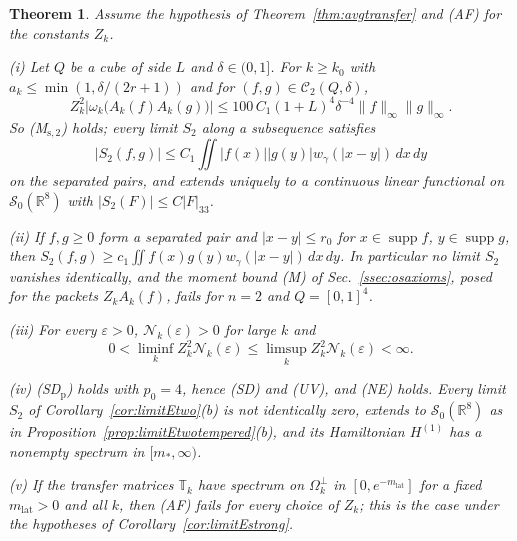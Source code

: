\documentclass[aps,prd,twocolumn,superscriptaddress,nofootinbib,longbibliography,floatfix,amsmath,amssymb,10pt]{revtex4-2}
\newtheorem{theorem}{Theorem}
\theoremstyle{definition}
\theoremstyle{remark}
\newcommand{\R}{\mathbb{R}}
\begin{document}
\begin{theorem}\label{thm:limitEaf}
Assume the hypothesis of Theorem~\textup{\ref{thm:avgtransfer}} and
\textup{(AF)} for the constants $Z_k$.

\textup{(i)} Let $Q$ be a cube of side $L$ and $\delta\in(0,1]$. For
$k\ge k_0$ with $a_k\le\min(1,\delta/(2r+1))$ and for $(f,g)\in\mathcal
C_2(Q,\delta)$,
\[
Z_k^2\bigl|\omega_k\bigl(A_k(f)A_k(g)\bigr)\bigr|\le100\,C_1(1+L)^4
\delta^{-4}\|f\|_\infty\|g\|_\infty .
\]
So \textup{(M$_{\mathrm s,2}$)} holds; every limit $S_2$ along a
subsequence satisfies
\[
|S_2(f,g)|\le C_1\iint|f(x)||g(y)|w_\gamma(|x-y|)\,dx\,dy
\]
on the separated pairs, and extends uniquely to a continuous linear
functional on $\mathcal S_0(\R^8)$ with $|S_2(F)|\le C|F|_{33}$.

\textup{(ii)} If $f,g\ge0$ form a separated pair and $|x-y|\le r_0$ for
$x\in\operatorname{supp}f$, $y\in\operatorname{supp}g$, then $S_2(f,g)\ge
c_1\iint f(x)g(y)w_\gamma(|x-y|)\,dx\,dy$. In particular no limit $S_2$
vanishes identically, and the moment bound \textup{(M)} of
Sec.~\textup{\ref{ssec:osaxioms}}, posed for the packets $Z_kA_k(f)$, fails
for $n=2$ and $Q=[0,1]^4$.

\textup{(iii)} For every $\varepsilon>0$, $\mathcal N_k(\varepsilon)>0$ for
large $k$ and
\[
0<\liminf_kZ_k^2\mathcal N_k(\varepsilon)\le\limsup_kZ_k^2\mathcal
N_k(\varepsilon)<\infty .
\]

\textup{(iv)} \textup{(SD$_{\mathrm p}$)} holds with $p_0=4$, hence
\textup{(SD)} and \textup{(UV)}, and \textup{(NE)} holds. Every limit
$S_2$ of Corollary~\textup{\ref{cor:limitEtwo}(b)} is not identically zero,
extends to $\mathcal S_0(\R^8)$ as in
Proposition~\textup{\ref{prop:limitEtwotempered}(b)}, and its Hamiltonian
$H^{(1)}$ has a nonempty spectrum in $[m_*,\infty)$.

\textup{(v)} If the transfer matrices $\mathbb T_k$ have spectrum on
$\Omega_k^\perp$ in $[0,e^{-m_{\mathrm{lat}}}]$ for a fixed $m_{\mathrm{lat}}
>0$ and all $k$, then \textup{(AF)} fails for every choice of $Z_k$; this
is the case under the hypotheses of
Corollary~\textup{\ref{cor:limitEstrong}}.
\end{theorem}
\end{document}
